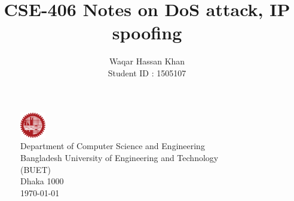 \documentclass[12pt]{article}
\title{
	\Large{CSE-406}
	\endgraf
	\Large{Notes on DoS attack, IP spoofing}
	\endgraf\bigskip	
}
\author{
	\Large{Waqar Hassan Khan}\\
	\Large{Student ID : 1505107}
}
\date{}
\begin{document}
\maketitle

\section*{}
\begin{figure}[b]
	\centering
	
	\captionsetup{justification=centering}
	\includegraphics[width = 0.1\textwidth]{image/buet.png}
	\caption*{
		\Large{Department of Computer Science and Engineering}
		\\
		\Large{Bangladesh University of Engineering and Technology}
		\\
		\Large{(BUET)}
		\\
		\Large{Dhaka 1000}
		\\
		\Large{\today}
	}
	
\end{figure}

\newpage
\tableofcontents
\newpage

\end{document}
